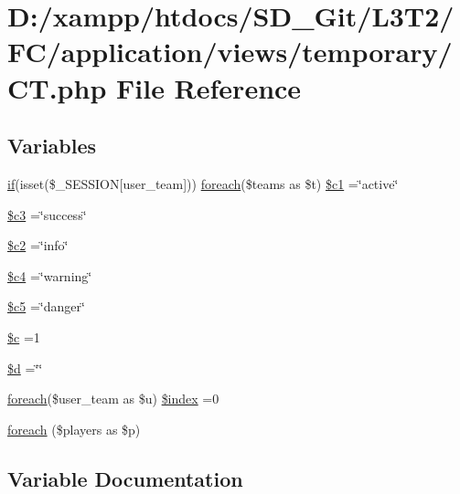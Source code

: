 \hypertarget{temporary_2_c_t_8php}{}\section{D\+:/xampp/htdocs/\+S\+D\+\_\+\+Git/\+L3\+T2/\+F\+C/application/views/temporary/\+C\+T.php File Reference}
\label{temporary_2_c_t_8php}
\subsection*{Variables}
\begin{DoxyCompactItemize}
\item 
\hyperlink{excanvas_8js_a409038cddd5fb941140f7ff76f5b7b15}{if}(isset(\$\+\_\+\+S\+E\+S\+S\+I\+O\+N\mbox{[}\textquotesingle{}user\+\_\+team\textquotesingle{}\mbox{]})) \hyperlink{view__points_8php_a7ad0caecb10918b48851bd7908ec97c5}{foreach}(\$teams as \$t) \hyperlink{temporary_2_c_t_8php_a19a60f61607211ec9bd8685cf9949285}{\$c1} =\char`\"{}active\char`\"{}
\item 
\hyperlink{temporary_2_c_t_8php_a78a28e488f33dbd56e562b07dc3862e3}{\$c3} =\char`\"{}success\char`\"{}
\item 
\hyperlink{temporary_2_c_t_8php_a7d0ce9eb4b126a1a12c7dade4f7ab7ef}{\$c2} =\char`\"{}info\char`\"{}
\item 
\hyperlink{temporary_2_c_t_8php_a480a6698b6eb8bfee885295be554a1e7}{\$c4} =\char`\"{}warning\char`\"{}
\item 
\hyperlink{temporary_2_c_t_8php_ad07a0ce016744e189c6f98b13c96812c}{\$c5} =\char`\"{}danger\char`\"{}
\item 
\hyperlink{temporary_2_c_t_8php_ab73d7f4f2dae233dd561e7fdaab3a77b}{\$c} =1
\item 
\hyperlink{temporary_2_c_t_8php_a0cf5dd496d9f5ff1edf00d234771dcfe}{\$d} =\char`\"{}\char`\"{}
\item 
\hyperlink{view__points_8php_a7ad0caecb10918b48851bd7908ec97c5}{foreach}(\$user\+\_\+team as \$u) \hyperlink{temporary_2_c_t_8php_af7d009a3f55ba9aa079cbea24e43d8ce}{\$index} =0
\item 
\hyperlink{temporary_2_c_t_8php_adeedc747f289831747aab8fb71df7bd3}{foreach} (\$players as \$p)
\end{DoxyCompactItemize}


\subsection{Variable Documentation}
\hypertarget{temporary_2_c_t_8php_ab73d7f4f2dae233dd561e7fdaab3a77b}{}
